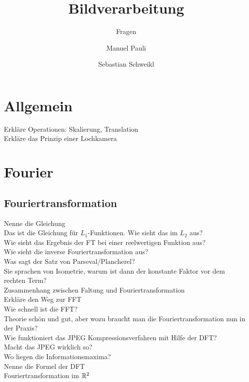 
\usepackage[pdftex]{graphicx}  


\title{Bildverarbeitung}
\subtitle{Fragen}
\author{Manuel Pauli\and{}Sebastian Schweikl}

\maketitle
\section{Allgemein} 
\begin{description}
	\item[Erkläre Operationen: Skalierung, Translation]
	\item[Erkläre das Prinzip einer Lochkamera]
\end{description}	
\section{Fourier}
\subsection{Fouriertransformation}
\begin{description}
	\item[Nenne die Gleichung]
    \item[Das ist die Gleichung für $L_1$-Funktionen. Wie sieht das im $L_2$ aus?]
	\item[Wie sieht das Ergebnis der FT bei einer reelwertigen Funktion aus?]
	\item[Wie sieht die inverse Fouriertransformation aus?]
    \item[Was sagt der Satz von Parseval/Plancherel?]
    \item[Sie sprachen von Isometrie, warum ist dann der konstante Faktor vor dem rechten Term?]
	\item[Zusammenhang zwischen Faltung und Fouriertransformation]
	\item[Erkläre den Weg zur FFT]
	\item[Wie schnell ist die FFT?]
    \item[Theorie schön und gut, aber wozu braucht man die Fouriertransformation nun in der Praxis?]
	\item[Wie funktioniert das JPEG Kompressionsverfahren mit Hilfe der DFT?]
    \item[Macht das JPEG wirklich so?]
	\item[Wo liegen die Informationsmaxima?]
	\item[Nenne die Formel der DFT]
	\item[Fouriertransformation im $\mathbb{R}^2$]
\end{description}
